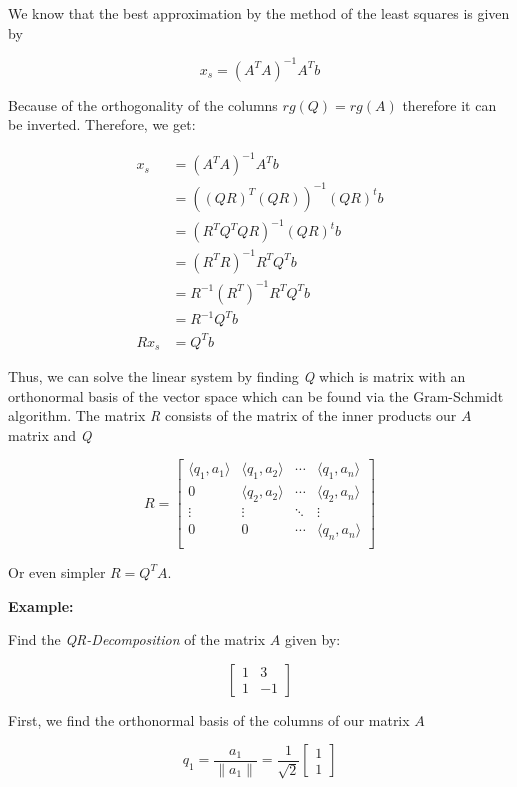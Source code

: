 We know that the best approximation by the method of the least squares is given by

\[
    x_s = (A^T A)^{-1} A^T b
\]

Because of the orthogonality of the columns \(rg(Q) = rg(A)\) therefore it can be inverted. Therefore,
we get:

\begin{align*}
    x_s &= (A^T A)^{-1} A^T b \\
        &= ((QR)^T (QR))^{-1} (QR)^t b \\
        &= (R^T Q^T QR)^{-1} (QR)^t b \\
        &= (R^T R)^{-1} R^T Q^T b \\
        &=  R^{-1} (R^T)^{-1} R^T Q^T b \\
        &=  R^{-1} Q^T b \\
    Rx_s&= Q^T b
\end{align*}

Thus, we can solve the linear system by finding \emph{Q} which is matrix with an orthonormal basis of the 
vector space which can be found via the Gram-Schmidt algorithm. The matrix \emph{R} consists of the matrix of the 
inner products our \(A\) matrix and \emph{Q}

\[
    R =
    \begin{bmatrix}
        \langle q_1, a_1 \rangle & \langle q_1, a_2 \rangle & \cdots &\langle q_1, a_n\rangle \\ 
        0 & \langle q_2, a_2 \rangle & \cdots & \langle q_2, a_n\rangle \\ 
        \vdots & \vdots  & \ddots & \vdots \\
        0 & 0  & \cdots & \langle q_n, a_n \rangle \\ 
    \end{bmatrix}
\]

Or even simpler \(R = Q^T A\).

\textbf{Example:}

Find the \emph{QR-Decomposition} of the matrix \(A\) given by:

\[
    \begin{bmatrix}
        1 & 3 \\
        1 & -1 
    \end{bmatrix}
\]

First, we find the orthonormal basis of the columns of our matrix \(A\) 

\[ 
    q_1 = \frac{a_1}{\|a_1\|} = \frac{1}{\sqrt{2}} \begin{bmatrix} 1 \\ 1 \end{bmatrix}
\]

